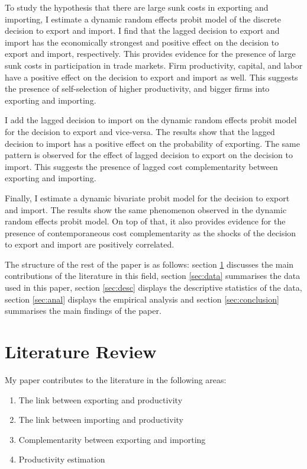 \documentclass[12pt]{article}
\begin{document}
To study the hypothesis that there are large sunk costs in exporting
and importing, I estimate a dynamic random effects probit model of the discrete
decision to export and import. I find that the lagged decision to
export and import has the
economically strongest and positive effect on the decision to export and
import, respectively.  This provides evidence for the presence of
large sunk costs in participation in trade markets. Firm productivity,
capital, and labor have a positive
effect on the decision to export and import as well. This suggests the
presence of self-selection of higher productivity, and bigger firms into exporting
and importing. 

I add the lagged decision to import on the dynamic random effects
probit model for the decision to export and vice-versa. The results show that the lagged
decision to import has a positive effect on the probability of
exporting. The same pattern is observed for the effect of lagged
decision to export on the decision to import. This suggests the
presence of lagged cost complementarity between exporting and
importing. 

Finally, I estimate a dynamic bivariate probit model for the decision to export
and import. The results show the same phenomenon observed in the
dynamic random effects probit model. On top of that, it also provides
evidence for the presence
of contemporaneous cost complementarity as the shocks of the decision
to export and import are positively correlated. 


The structure of the rest of the paper is as follows: section \ref{sec:lit} discusses
the main contributions of the literature in this field, section
\ref{sec:data} summarises the data used in this paper, section
\ref{sec:desc} displays the descriptive statistics of the data,
section \ref{sec:anal} displays the empirical analysis and section 
\ref{sec:conclusion} summarises the main findings of the paper. 


\section{Literature Review}\label{sec:lit}
My paper contributes to the literature in the following areas: 
\begin{enumerate}
\item The link between exporting and productivity
\item The link between importing and productivity 
\item Complementarity between exporting and importing
\item Productivity estimation
\end{enumerate}
\end{document}

